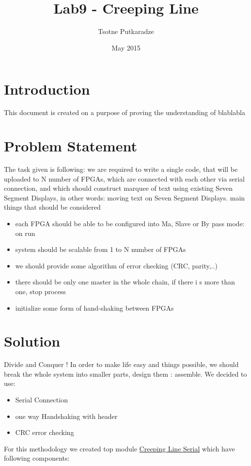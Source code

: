 \documentclass{article}
\title{Lab9 - Creeping Line}
\author{Tsotne Putkaradze }
\date{May 2015}
\begin{document}
\maketitle
\tableofcontents
\vspace{20mm} %

\listoffigures

\vfill
\section*{Introduction}
This document is created on a purpose of proving the understanding of blablabla

\clearpage
\section{Problem Statement}
The task given is following: we are required to write a single code, that will be uploaded to N number of FPGAs, which are connected with each other via serial connection, and which should construct marquee of text using existing Seven Segment Displays, in other words: moving text on Seven Segment Displays.
main things that should be considered \citep{digitalSystemsLab9}     

\begin{itemize}
     \item each FPGA should be able to be configured into Ma, Slave or By    pass mode: on run
     \item system should be scalable from 1     to N number of FPGAs
     \item we should provide some algorithm of error     checking (CRC, parity,..)
     \item there should be only one master in the whole chain, if there i    s more than one, stop process
     \item initialize some form of hand-shaking between FPGAs
\end{itemize}


\clearpage
\section{Solution}
Divide and Conquer ! 
In order to make life easy and things possible, we should break the whole system into smaller parts, design them : assemble.
We decided to use:
    \begin{itemize}
    \item Serial Connection
    \item one way Handshaking with header     
    \item CRC error checking
    \end{itemize}
For this methodology we created top module \href{/vhd/Creeping_Line_Serial.vhd}{Creeping Line Serial} which have following components:
\end{document}
